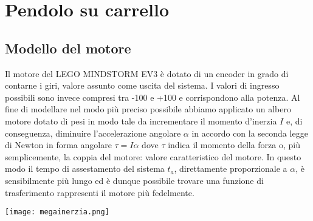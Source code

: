 
\chapter{Pendolo su carrello}
\section{Modello del motore}
Il motore del LEGO MINDSTORM EV3 è dotato di un encoder in grado di contarne i giri, valore assunto come uscita del sistema.
I valori di ingresso possibili sono invece compresi tra -100 e +100 e corrispondono alla potenza.
Al fine di modellare nel modo più preciso possibile abbiamo applicato un albero motore dotato di pesi in modo tale da incrementare il momento d'inerzia $I$ e, di conseguenza, diminuire l'accelerazione angolare $\alpha$ in accordo con la seconda legge di Newton in forma angolare $\tau = I\alpha$ dove $\tau$ indica il momento della forza o, più semplicemente, la coppia del motore: valore caratteristico del motore.
In questo modo il tempo di assestamento del sistema $t_a$, direttamente proporzionale a $\alpha$, è sensibilmente più lungo ed è dunque possibile trovare una funzione di trasferimento rappresenti il motore più fedelmente.
\begin{center}
	\texttt{[image: megainerzia.png]}
\end{center}